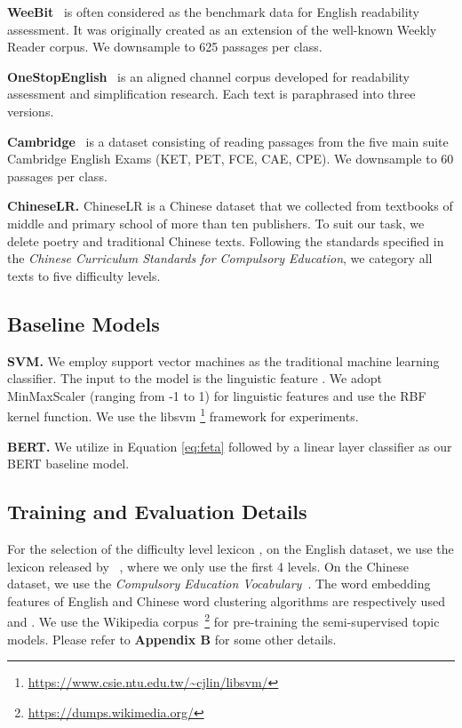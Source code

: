 \documentclass[11pt]{article}
\begin{document}
\textbf{WeeBit}~\cite{vajjala2012improving} is often considered as the benchmark data for English readability assessment. It was originally created as an extension of the well-known Weekly Reader corpus. 
We downsample to 625 passages per class.

\textbf{OneStopEnglish}~\cite{vajjala2018onestopenglish} is an aligned channel corpus developed for readability assessment and simplification research. Each text is paraphrased into three versions.

\textbf{Cambridge}~\cite{xia2019text} is a dataset consisting of reading passages from the five main suite Cambridge English Exams (KET, PET, FCE, CAE, CPE). 
We downsample to 60 passages per class.

\textbf{ChineseLR.} ChineseLR is a Chinese dataset that we collected from textbooks of middle and primary school of more than ten publishers. To suit our task, we delete poetry and traditional Chinese texts. Following the standards specified in the \textit{Chinese Curriculum Standards for Compulsory Education}, we category all texts to five difficulty levels.


\subsection{Baseline Models}

\textbf{SVM.} We employ support vector machines as the traditional machine learning classifier. The input to the model is the linguistic feature . We adopt MinMaxScaler (ranging from -1 to 1) for linguistic features and use the RBF kernel function. We use the libsvm \footnote{\url{https://www.csie.ntu.edu.tw/~cjlin/libsvm/}} framework for experiments. 

\noindent\textbf{BERT.} We utilize  in Equation \ref{eq:feta} followed by a linear layer classifier as our BERT baseline model.



\subsection{Training and Evaluation Details}
For the selection of the difficulty level lexicon , on the English dataset, we use the lexicon released by ~\citet{maddela2018word}, where we only use the first 4 levels. On the Chinese dataset, we use the \textit{Compulsory Education Vocabulary}~\cite{Su2019CECV}. 
The word embedding features of English and Chinese word clustering algorithms are respectively used \cite{pennington2014glove} and \cite{song2018directional}. We use the Wikipedia corpus~\footnote{\url{https://dumps.wikimedia.org/}} for pre-training the semi-supervised topic models. 
Please refer to \textbf{Appendix B} for some other details.
\end{document}
